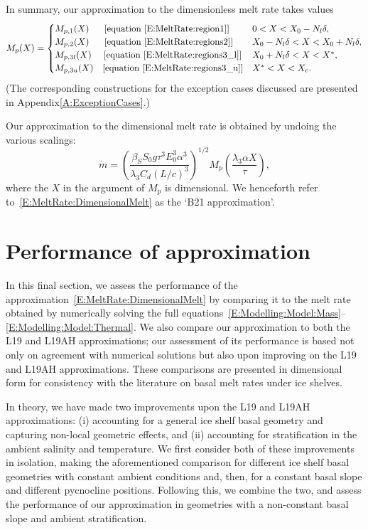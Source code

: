 \documentclass{jfm}
\newcommand{\lt}{\delta} %
\begin{document}
In summary, our approximation to the dimensionless melt rate takes values
\begin{equation}\label{E:MeltRate:AllRegions}
M_{p}(X) = \begin{cases} 
M_{p,1}(X) \text{~~\quad [equation~\eqref{E:MeltRate:region1}]}  & 0 < X < X_0 - N_l \lt,\\
M_{p,2}(X) \text{~~\quad [equation~\eqref{E:MeltRate:regions2}]} & X_0 - N_l \lt < X < X_0 + N_l \lt,\\
M_{p,3l}(X) \text{~\quad [equation~\eqref{E:MeltRate:regions3_l}]} & X_0 + N_l \lt < X < X^*,\\
M_{p,3u}(X) \text{\quad [equation~\eqref{E:MeltRate:regions3_u}]} & X^* < X < X_c.
\end{cases}
\end{equation}
(The corresponding constructions for the exception cases discussed are presented in Appendix\ref{A:ExceptionCases}.)

Our approximation to the dimensional melt rate is obtained by undoing the various scalings:
\begin{equation}\label{E:MeltRate:DimensionalMelt}
\dot{m} =\left(\frac{\beta_S S_0 g \tau^3 E_0^3 \alpha^3}{\lambda_3 C_d (L/c)^3}\right)^{1/2} M_p\left(\frac{\lambda_3 \alpha X}{\tau}\right),
\end{equation}
where the $X$ in the argument of $M_p$ is dimensional. We henceforth refer to~\eqref{E:MeltRate:DimensionalMelt} as the `B21 approximation'.


\section{Performance of approximation}\label{S:Numerics}
In this final section, we assess the performance of the approximation~\eqref{E:MeltRate:DimensionalMelt} by comparing it to the melt rate obtained by  numerically solving the full equations~\eqref{E:Modelling:Model:Mass}--\eqref{E:Modelling:Model:Thermal}. We also compare our approximation to both the L19 and L19AH approximations; our assessment of its performance is based not only on agreement with numerical solutions but also upon improving on the L19 and L19AH approximations. These comparisons are presented in dimensional form for consistency with the literature on basal melt rates under ice shelves.

In theory, we have made two improvements upon the L19 and L19AH approximations: (i) accounting for a general ice shelf basal geometry and capturing non-local geometric effects, and (ii) accounting for stratification in the ambient salinity and temperature. We first consider both of these improvements in isolation, making the aforementioned comparison for different ice shelf basal geometries with constant ambient conditions and, then, for a constant basal slope and different pycnocline positions. Following this, we combine the two, and assess the performance of our approximation in geometries with a non-constant basal slope and ambient stratification.
\end{document}
